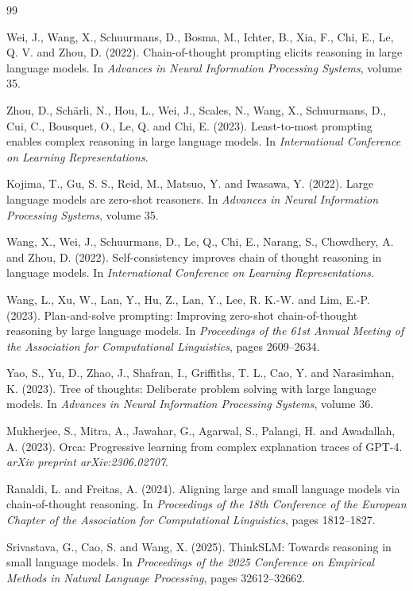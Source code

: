 \documentclass[12pt]{article}
\begin{document}
\begin{thebibliography}{99}

Wei, J., Wang, X., Schuurmans, D., Bosma, M., Ichter, B., Xia, F., Chi, E., Le, Q. V. and Zhou, D. (2022).
Chain-of-thought prompting elicits reasoning in large language models.
In \textit{Advances in Neural Information Processing Systems}, volume 35.

Zhou, D., Schärli, N., Hou, L., Wei, J., Scales, N., Wang, X., Schuurmans, D., Cui, C., Bousquet, O., Le, Q. and Chi, E. (2023).
Least-to-most prompting enables complex reasoning in large language models.
In \textit{International Conference on Learning Representations}.


Kojima, T., Gu, S. S., Reid, M., Matsuo, Y. and Iwasawa, Y. (2022).
Large language models are zero-shot reasoners.
In \textit{Advances in Neural Information Processing Systems}, volume 35.

Wang, X., Wei, J., Schuurmans, D., Le, Q., Chi, E., Narang, S., Chowdhery, A. and Zhou, D. (2022).
Self-consistency improves chain of thought reasoning in language models.
In \textit{International Conference on Learning Representations}.

Wang, L., Xu, W., Lan, Y., Hu, Z., Lan, Y., Lee, R. K.-W. and Lim, E.-P. (2023).
Plan-and-solve prompting: Improving zero-shot chain-of-thought reasoning by large language models.
In \textit{Proceedings of the 61st Annual Meeting of the Association for Computational Linguistics}, pages 2609--2634.

Yao, S., Yu, D., Zhao, J., Shafran, I., Griffiths, T. L., Cao, Y. and Narasimhan, K. (2023).
Tree of thoughts: Deliberate problem solving with large language models.
In \textit{Advances in Neural Information Processing Systems}, volume 36.

Mukherjee, S., Mitra, A., Jawahar, G., Agarwal, S., Palangi, H. and Awadallah, A. (2023).
Orca: Progressive learning from complex explanation traces of GPT-4.
\textit{arXiv preprint arXiv:2306.02707}.

Ranaldi, L. and Freitas, A. (2024).
Aligning large and small language models via chain-of-thought reasoning.
In \textit{Proceedings of the 18th Conference of the European Chapter of the Association for Computational Linguistics}, pages 1812--1827.

Srivastava, G., Cao, S. and Wang, X. (2025).
ThinkSLM: Towards reasoning in small language models.
In \textit{Proceedings of the 2025 Conference on Empirical Methods in Natural Language Processing}, pages 32612--32662.


\end{thebibliography}
\end{document}
